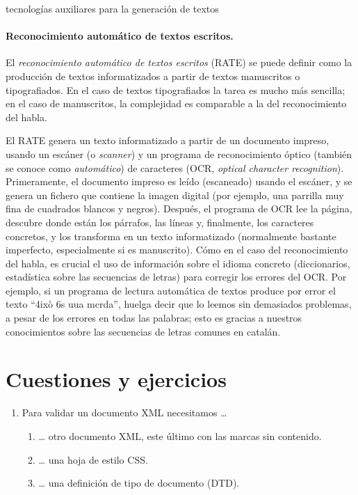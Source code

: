 {\begin{persabermes}{tecnologías auxiliares para la generación de textos}
\paragraph{Reconocimiento automático de textos escritos.} El \emph{reconocimiento automático de textos escritos} (RATE) se puede definir como la producción de textos informatizados a partir de textos manuscritos o tipografiados. En el caso de textos tipografiados la tarea es mucho más sencilla; en el caso de manuscritos, la complejidad es comparable a la del reconocimiento del habla. 

El RATE genera un texto informatizado a partir de un documento impreso, usando un escáner (o \emph{scanner}) y un programa de reconocimiento óptico (también se conoce como {\em automático}) de caracteres (OCR, \emph{optical character recognition}). Primeramente, el documento impreso es leído (escaneado) usando el escáner, y se  genera un fichero que  contiene la imagen digital (por ejemplo, una parrilla muy fina de cuadrados blancos y negros). Después, el programa de OCR lee la página, descubre donde están los párrafos, las líneas y, finalmente, los caracteres concretos, y los transforma en un texto informatizado (normalmente bastante imperfecto, especialmente si es manuscrito). Cómo en el caso del reconocimiento del habla, es crucial el uso de información sobre el idioma concreto (diccionarios, estadística sobre las secuencias de letras) para corregir los errores del OCR. Por ejemplo, si un programa de lectura automática de textos produce por error el texto ``4ixò 6s uua mcrda'', huelga decir que lo leemos sin demasiados problemas, a pesar de los errores en todas las palabras; esto es gracias a nuestros conocimientos sobre las secuencias de letras comunes en catalán. 

\mbox{} \end{persabermes} 

\section{Cuestiones y ejercicios} \begin{enumerate} \item Para validar un documento XML necesitamos {\ldots} \begin{enumerate} \item {\ldots} otro documento XML, este último con las marcas sin contenido. \item {\ldots} una hoja de estilo CSS. \item {\ldots} una definición de tipo de documento (DTD). \end{enumerate} 


\end{enumerate}}
